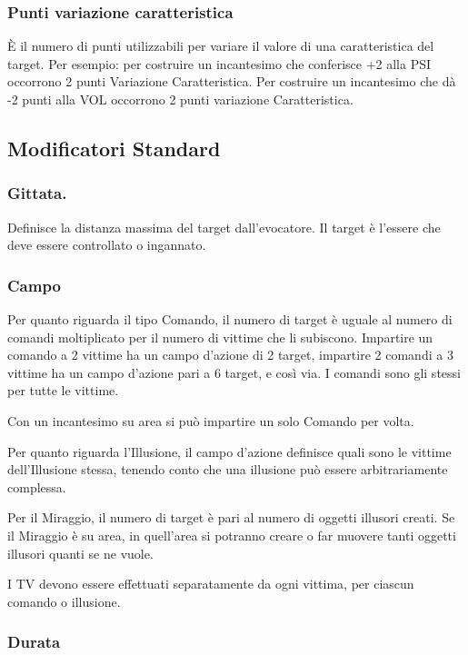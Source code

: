 \subsubsection{Punti variazione caratteristica}

\`E il numero di punti utilizzabili per variare il valore di una
caratteristica del target. Per esempio: per costruire un incantesimo
che conferisce +2 alla PSI occorrono 2 punti Variazione
Caratteristica. Per costruire un incantesimo che d\`a -2 punti alla
VOL occorrono 2 punti variazione Caratteristica.

\subsection{Modificatori
Standard}

\subsubsection{Gittata.}Definisce la distanza massima del target dall'evocatore.
Il target \`e l'essere che deve essere controllato o ingannato.

\subsubsection{Campo}

Per quanto riguarda il tipo Comando, il numero di target \`e uguale al
numero di comandi moltiplicato per il numero di vittime che li
subiscono. Impartire un comando a 2 vittime ha un campo d'azione di 2
target, impartire 2 comandi a 3 vittime ha un campo d'azione pari a 6
target, e cos\`i via. I comandi sono gli stessi per tutte le vittime.

Con un incantesimo su area si pu\`o impartire un solo Comando per
volta.

Per quanto riguarda l'Illusione, il campo d'azione definisce quali
sono le vittime dell'Illusione stessa, tenendo conto che una illusione
pu\`o essere arbitrariamente complessa.

Per il Miraggio, il numero di target \`e pari al numero di oggetti
illusori creati. Se il Miraggio \`e su area, in quell'area si potranno
creare o far muovere tanti oggetti illusori quanti se ne vuole.

I TV devono essere effettuati separatamente da ogni vittima, per ciascun
comando o illusione.


\subsubsection{Durata} 

